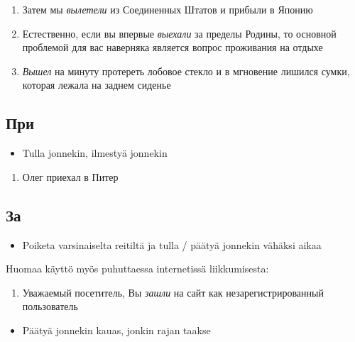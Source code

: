 \documentclass[]{scrreprt}
\providecommand{\tightlist}{%
  \setlength{\itemsep}{0pt}\setlength{\parskip}{0pt}}
\begin{document}
\begin{enumerate}
\def\labelenumi{(\arabic{enumi})}
\setcounter{enumi}{422}
\tightlist
\item
  Затем мы \emph{вылетели} из Соединенных Штатов и прибыли в Японию
\item
  Естественно, если вы впервые \emph{выехали} за пределы Родины, то
  основной проблемой для вас наверняка является вопрос проживания на
  отдыхе
\item
  \emph{Вышел} на минуту протереть лобовое стекло и в мгновение лишился
  сумки, которая лежала на заднем сиденье
\end{enumerate}

\subsection{При}\label{ux43fux440ux438}

\begin{itemize}
\tightlist
\item
  Tulla jonnekin, ilmestyä jonnekin
\end{itemize}

\begin{enumerate}
\def\labelenumi{(\arabic{enumi})}
\setcounter{enumi}{425}
\tightlist
\item
  Олег приехал в Питер
\end{enumerate}

\subsection{За}\label{ux437ux430}

\begin{itemize}
\tightlist
\item
  Poiketa varsinaiselta reitiltä ja tulla / päätyä jonnekin vähäksi
  aikaa
\end{itemize}

Huomaa käyttö myös puhuttaessa internetissä liikkumisesta:

\begin{enumerate}
\def\labelenumi{(\arabic{enumi})}
\setcounter{enumi}{426}
\tightlist
\item
  Уважаемый посетитель, Вы \emph{зашли} на сайт как незарегистрированный
  пользователь
\end{enumerate}

\begin{itemize}
\tightlist
\item
  Päätyä jonnekin kauas, jonkin rajan taakse
\end{itemize}
\end{document}
